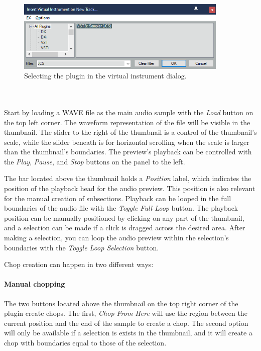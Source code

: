 \documentclass[12pt, a4paper, hidelinks]{article}
\begin{document}
	\begin{figure}[h]
		\centering
		\includegraphics[width=0.9\textwidth]{u/load.png}
		\caption{Selecting the plugin in the virtual instrument dialog.}
		\label{fig:load}
	\end{figure}
	
	~\\
	~\\
	Start by loading a WAVE file as the main audio sample with the \textit{Load} button on the top left corner. The waveform representation of the file will be visible in the thumbnail. The slider to the right of the thumbnail is a control of the thumbnail's scale, while the slider beneath is for horizontal scrolling when the scale is larger than the thumbnail's boundaries. The preview's playback can be controlled with the \textit{Play}, \textit{Pause}, and \textit{Stop} buttons on the panel to the left. \par 
	The bar located above the thumbnail holds a \textit{Position} label, which indicates the position of the playback head for the audio preview. This position is also relevant for the manual creation of subsections. Playback can be looped in the full boundaries of the audio file with the \textit{Toggle Full Loop} button. The playback position can be manually positioned by clicking on any part of the thumbnail, and a selection can be made if a click is dragged across the desired area. After making a selection, you can loop the audio preview within the selection's boundaries with the \textit{Toggle Loop Selection} button. \par
	
	Chop creation can happen in two different ways:
	\paragraph{Manual chopping\\}
	The two buttons located above the thumbnail on the top right corner of the plugin create chops. The first, \textit{Chop From Here} will use the region between the current position and the end of the sample to create a chop. The second option will only be available if a selection is exists in the thumbnail, and it will create a chop with boundaries equal to those of the selection.
\end{document}

